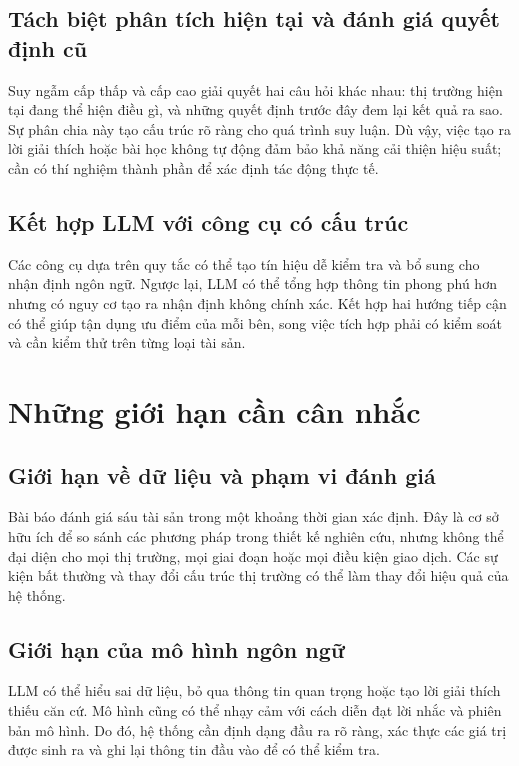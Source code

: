 \subsection{Tách biệt phân tích hiện tại và đánh giá quyết định cũ}
Suy ngẫm cấp thấp và cấp cao giải quyết hai câu hỏi khác nhau: thị trường hiện tại đang thể hiện điều gì, và những quyết định trước đây đem lại kết quả ra sao. Sự phân chia này tạo cấu trúc rõ ràng cho quá trình suy luận. Dù vậy, việc tạo ra lời giải thích hoặc bài học không tự động đảm bảo khả năng cải thiện hiệu suất; cần có thí nghiệm thành phần để xác định tác động thực tế.

\subsection{Kết hợp LLM với công cụ có cấu trúc}
Các công cụ dựa trên quy tắc có thể tạo tín hiệu dễ kiểm tra và bổ sung cho nhận định ngôn ngữ. Ngược lại, LLM có thể tổng hợp thông tin phong phú hơn nhưng có nguy cơ tạo ra nhận định không chính xác. Kết hợp hai hướng tiếp cận có thể giúp tận dụng ưu điểm của mỗi bên, song việc tích hợp phải có kiểm soát và cần kiểm thử trên từng loại tài sản.

\section{Những giới hạn cần cân nhắc}

\subsection{Giới hạn về dữ liệu và phạm vi đánh giá}
Bài báo đánh giá sáu tài sản trong một khoảng thời gian xác định. Đây là cơ sở hữu ích để so sánh các phương pháp trong thiết kế nghiên cứu, nhưng không thể đại diện cho mọi thị trường, mọi giai đoạn hoặc mọi điều kiện giao dịch. Các sự kiện bất thường và thay đổi cấu trúc thị trường có thể làm thay đổi hiệu quả của hệ thống.

\subsection{Giới hạn của mô hình ngôn ngữ}
LLM có thể hiểu sai dữ liệu, bỏ qua thông tin quan trọng hoặc tạo lời giải thích thiếu căn cứ. Mô hình cũng có thể nhạy cảm với cách diễn đạt lời nhắc và phiên bản mô hình. Do đó, hệ thống cần định dạng đầu ra rõ ràng, xác thực các giá trị được sinh ra và ghi lại thông tin đầu vào để có thể kiểm tra.

